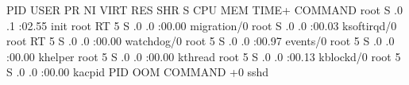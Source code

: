 \documentclass[letterpaper,10pt,english]{sphinxmanual}
\begin{document}
\begin{sphinxVerbatim}[commandchars=\\\{\}]
  PID USER  PR  NI  VIRT  RES  SHR S \PYGZpc{}CPU \PYGZpc{}MEM    TIME+  COMMAND
     root            S  .0  .1   :02.55 init
     root  RT  \PYGZhy{}5              S  .0  .0   :00.00 migration/0
     root                  S  .0  .0   :00.03 ksoftirqd/0
     root  RT  \PYGZhy{}5              S  .0  .0   :00.00 watchdog/0
     root    \PYGZhy{}5              S  .0  .0   :00.97 events/0
     root    \PYGZhy{}5              S  .0  .0   :00.00 khelper
     root    \PYGZhy{}5              S  .0  .0   :00.00 kthread
    root    \PYGZhy{}5              S  .0  .0   :00.13 kblockd/0
    root    \PYGZhy{}5              S  .0  .0   :00.00 kacpid
  PID    OOM    COMMAND
     +0    sshd
\end{sphinxVerbatim}
\end{document}
